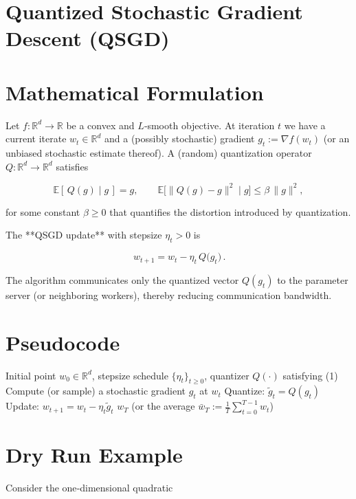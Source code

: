 \documentclass{article}
\newcommand{\E}{\mathbb{E}}
\newcommand{\R}{\mathbb{R}}
\begin{document}
\section*{Quantized Stochastic Gradient Descent (QSGD)}

\section*{Mathematical Formulation}
Let $f:\R^{d}\rightarrow \R$ be a convex and $L$‑smooth objective.  
At iteration $t$ we have a current iterate $w_{t}\in\R^{d}$ and a (possibly stochastic) gradient $g_{t}:=\nabla f(w_{t})$ (or an unbiased stochastic estimate thereof).  
A (random) quantization operator $Q:\R^{d}\rightarrow\R^{d}$ satisfies  

\[
\E[\,Q(g)\mid g\,]=g,\qquad 
\E\big[\|Q(g)-g\|^{2}\mid g\big]\leq \beta\,\|g\|^{2},
\tag{1}
\]

for some constant $\beta\ge 0$ that quantifies the distortion introduced by quantization.  

The **QSGD update** with stepsize $\eta_{t}>0$ is  

\[
\boxed{\,w_{t+1}=w_{t}-\eta_{t}\,Q\!\big(g_{t}\big)\,}. \tag{2}
\]

The algorithm communicates only the quantized vector $Q(g_{t})$ to the parameter server (or neighboring workers), thereby reducing communication bandwidth.

\section*{Pseudocode}
\begin{algorithm}[H]
\caption{Quantized Stochastic Gradient Descent}
\begin{algorithmic}[1]
\Require Initial point $w_{0}\in\R^{d}$, stepsize schedule $\{\eta_{t}\}_{t\ge 0}$, quantizer $Q(\cdot)$ satisfying (1)
    \State Compute (or sample) a stochastic gradient $g_{t}$ at $w_{t}$ 
    \State Quantize: $\tilde g_{t}=Q(g_{t})$   
    \State Update: $w_{t+1}=w_{t}-\eta_{t}\tilde g_{t}$
\EndFor
\State \Return $w_{T}$ (or the average $\bar w_{T}:=\frac{1}{T}\sum_{t=0}^{T-1}w_{t}$)
\end{algorithmic}
\end{algorithm}

\section*{Dry Run Example}
Consider the one‑dimensional quadratic  
\end{document}
